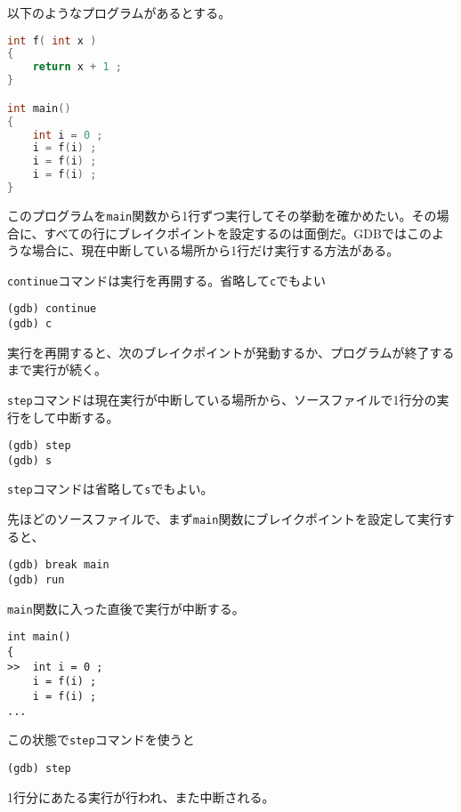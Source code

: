 
以下のようなプログラムがあるとする。

\begin{lstlisting}[language={C++}]
int f( int x )
{
    return x + 1 ;
}

int main()
{
    int i = 0 ;
    i = f(i) ;
    i = f(i) ;
    i = f(i) ;
}
\end{lstlisting}

このプログラムを\texttt{main}関数から1行ずつ実行してその挙動を確かめたい。その場合に、すべての行にブレイクポイントを設定するのは面倒だ。GDBではこのような場合に、現在中断している場所から1行だけ実行する方法がある。


\texttt{continue}コマンドは実行を再開する。省略して\texttt{c}でもよい

\begin{lstlisting}[style=terminal]
(gdb) continue
(gdb) c
\end{lstlisting}

実行を再開すると、次のブレイクポイントが発動するか、プログラムが終了するまで実行が続く。


\texttt{step}コマンドは現在実行が中断している場所から、ソースファイルで1行分の実行をして中断する。

\begin{lstlisting}[style=terminal]
(gdb) step
(gdb) s
\end{lstlisting}

\texttt{step}コマンドは省略して\texttt{s}でもよい。

先ほどのソースファイルで、まず\texttt{main}関数にブレイクポイントを設定して実行すると、
\begin{lstlisting}[style=terminal]
(gdb) break main
(gdb) run
\end{lstlisting}
\texttt{main}関数に入った直後で実行が中断する。

\begin{lstlisting}[style=terminal]
int main()
{
>>  int i = 0 ;
    i = f(i) ;
    i = f(i) ;
...
\end{lstlisting}

この状態で\texttt{step}コマンドを使うと
\begin{lstlisting}[style=terminal]
(gdb) step
\end{lstlisting}
1行分にあたる実行が行われ、また中断される。

